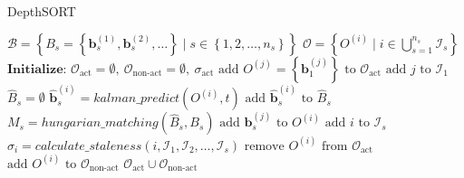         \begin{algorithm}[t]
            \caption[DepthSORT]{DepthSORT}
            \label{alg:depth_sort}
            \begin{algorithmic}[1]
                \Require $\mathcal{B} = \left\{B_s = \left\{\bm{b}_s^{(1)}, \bm{b}_s^{(2)}, \dots\right\} \mid s \in \left\{1, 2, \dots, n_s\right\}\right\}$
                \Ensure $\mathcal{O} = \left\{O^{(i)} \mid i \in \bigcup_{s=1}^{n_s} \mathcal{I}_{s}\right\}$
                \State $\textbf{Initialize: } \mathcal{O}_{\text{act}} = \emptyset,\ \mathcal{O}_{\text{non-act}} = \emptyset,\ \sigma_{\text{act}}$
                    \State $\text{add } O^{(j)} = \left\{\bm{b}_1^{(j)}\right\} \text{ to } \mathcal{O}_{\text{act}}$
                    \State $\text{add } j \text{ to }\mathcal{I}_1$
                \EndFor
                    \State $\hat{B}_s = \emptyset$
                        \State $\hat{\bm{b}}_s^{(i)} = kalman\_predict(O^{(i)}, t)$
                        \State $\text{add } \hat{\bm{b}}_s^{(i)} \text{ to }\hat{B}_s $
                    \EndFor
                    \State $M_s = hungarian\_matching(\hat{B}_s, B_s)$
                        \State $\text{add } \bm{b}_s^{(j)} \text{ to } O^{(i)}$
                        \State $\text{add } i \text{ to } \mathcal{I}_s$
                    \EndFor
                        \State $\sigma_i = calculate\_staleness(i, \mathcal{I}_1, \mathcal{I}_2, \dots, \mathcal{I}_s)$
                            \State $\text{remove } O^{(i)} \text{ from } \mathcal{O}_{\text{act}}$
                            \State $\text{add } O^{(i)} \text{ to } \mathcal{O}_{\text{non-act}}$
                        \EndIf
                    \EndFor
                \EndFor
                \State \Return $\mathcal{O}_{\text{act}} \cup \mathcal{O}_{\text{non-act}}$
            \end{algorithmic}
        \end{algorithm}


